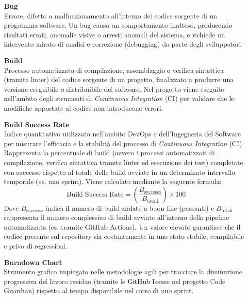 \documentclass[12pt, a4paper]{article}
\begin{document}
\noindent\hypertarget{bug}{\textbf{Bug}} \\[0.1em]
Errore, difetto o malfunzionamento all'interno del codice sorgente di un programma software. Un bug causa un comportamento inatteso, producendo risultati errati, anomalie visive o arresti anomali del sistema, e richiede un intervento mirato di analisi e correzione (debugging) da parte degli sviluppatori.
\vspace{0.5cm}

\noindent\hypertarget{build}{\textbf{Build}} \\[0.1em]
Processo automatizzato di compilazione, assemblaggio e verifica sintattica (tramite linter) del codice sorgente di un progetto, finalizzato a produrre una versione eseguibile o distribuibile del software. Nel progetto viene eseguito nell’ambito degli strumenti di \textit{Continuous Integration} (CI) per validare che le modifiche apportate al codice non introducano errori.
\vspace{0.5cm}

\noindent\hypertarget{build-success-rate}{\textbf{Build Success Rate}} \\[0.1em]
Indice quantitativo utilizzato nell'ambito DevOps e dell'Ingegneria del Software per misurare l'efficacia e la stabilità del processo di \textit{Continuous Integration} (CI). Rappresenta la percentuale di build (ovvero i processi automatizzati di compilazione, verifica sintattica tramite linter ed esecuzione dei test) completate con successo rispetto al totale delle build avviate in un determinato intervallo temporale (es. uno sprint). Viene calcolato mediante la seguente formula:
\begin{equation}
\text{Build Success Rate} = \left( \frac{B_{\text{successo}}}{B_{\text{totali}}} \right) \times 100
\end{equation}
Dove $B_{\text{successo}}$ indica il numero di build andate a buon fine (passanti) e $B_{\text{totali}}$ rappresenta il numero complessivo di build avviate all'interno della pipeline automatizzata (es. tramite GitHub Actions). Un valore elevato garantisce che il codice presente sul repository sia costantemente in uno stato stabile, compilabile e privo di regressioni.
\vspace{0.5cm}

\noindent\hypertarget{burndown-chart}{\textbf{Burndown Chart}} \\[0.1em]
Strumento grafico impiegato nelle metodologie agili per tracciare la diminuzione progressiva del lavoro residuo (tramite le GitHub Issues nel progetto Code Guardian) rispetto al tempo disponibile nel corso di uno sprint.
\vspace{0.1cm}
\newpage
\end{document}
